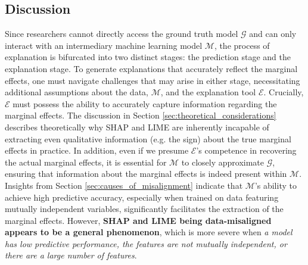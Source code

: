\documentclass[12pt]{article}  %
\begin{document}
    \subsection{Discussion}
            Since researchers cannot directly access the ground truth model $\mathcal{G}$ and can only interact with an intermediary machine learning model $\mathcal{M}$, the process of explanation is bifurcated into two distinct stages: the prediction stage and the explanation stage. To generate explanations that accurately reflect the marginal effects, one must navigate challenges that may arise in either stage, necessitating additional assumptions about the data, $\mathcal{M}$, and the explanation tool $\mathcal{E}$. Crucially, $\mathcal{E}$ must possess the ability to accurately capture information regarding the marginal effects. The discussion in Section \ref{sec:theoretical_considerations} describes theoretically why SHAP and LIME are inherently incapable of extracting even qualitative information (e.g. the sign) about the true marginal effects in practice. In addition, even if we presume $\mathcal{E}$'s competence in recovering the actual marginal effects, it is essential for $\mathcal{M}$ to closely approximate $\mathcal{G}$, ensuring that information about the marginal effects is indeed present within $\mathcal{M}$. Insights from Section \ref{sec:causes_of_misalignment} indicate that $\mathcal{M}$'s ability to achieve high predictive accuracy, especially when trained on data featuring mutually independent variables, significantly facilitates the extraction of the marginal effects. However, \textbf{SHAP and LIME being data-misaligned appears to be a general phenomenon}, which is more severe when \textit{a model has low predictive performance, the features are not mutually independent, or there are a large number of features}. 


\end{document}
